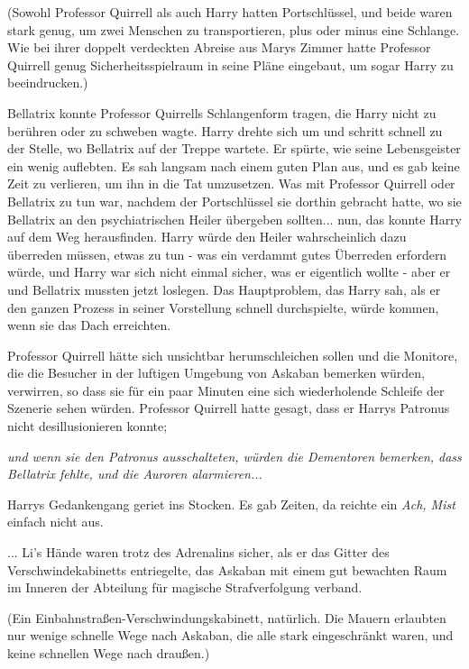 (Sowohl Professor Quirrell als auch Harry hatten Portschlüssel, und beide waren
stark genug, um zwei Menschen zu transportieren, plus oder minus eine Schlange.
Wie bei ihrer doppelt verdeckten Abreise aus Marys Zimmer hatte Professor
Quirrell genug Sicherheitsspielraum in seine Pläne eingebaut, um sogar Harry zu
beeindrucken.)

Bellatrix konnte Professor Quirrells Schlangenform tragen, die Harry nicht zu
berühren oder zu schweben wagte. Harry drehte sich um und schritt schnell zu der
Stelle, wo Bellatrix auf der Treppe wartete. Er spürte, wie seine Lebensgeister
ein wenig auflebten. Es sah langsam nach einem guten Plan aus, und es gab keine
Zeit zu verlieren, um ihn in die Tat umzusetzen. Was mit Professor Quirrell oder
Bellatrix zu tun war, nachdem der Portschlüssel sie dorthin gebracht hatte, wo
sie Bellatrix an den psychiatrischen Heiler übergeben sollten... nun, das konnte
Harry auf dem Weg herausfinden. Harry würde den Heiler wahrscheinlich dazu
überreden müssen, etwas zu tun - was ein verdammt gutes Überreden erfordern
würde, und Harry war sich nicht einmal sicher, was er eigentlich wollte - aber
er und Bellatrix mussten jetzt loslegen. Das Hauptproblem, das Harry sah, als er
den ganzen Prozess in seiner Vorstellung schnell durchspielte, würde kommen,
wenn sie das Dach erreichten.

Professor Quirrell hätte sich unsichtbar herumschleichen sollen und die
Monitore, die die Besucher in der luftigen Umgebung von Askaban bemerken würden,
verwirren, so dass sie für ein paar Minuten eine sich wiederholende Schleife der
Szenerie sehen würden. Professor Quirrell hatte gesagt, dass er Harrys Patronus
nicht desillusionieren konnte;

\emph{und wenn sie den Patronus ausschalteten, würden die Dementoren bemerken,
dass Bellatrix fehlte, und die Auroren alarmieren...}

Harrys Gedankengang geriet ins Stocken.
Es gab Zeiten, da reichte ein \emph{ \glqq{}Ach, Mist\grqq{}} einfach nicht
aus.

... Li's Hände waren trotz des Adrenalins sicher, als er das Gitter des
Verschwindekabinetts entriegelte, das Askaban mit einem gut bewachten Raum im
Inneren der Abteilung für magische Strafverfolgung verband.

(Ein Einbahnstraßen-Verschwindungskabinett, natürlich. Die Mauern erlaubten nur
wenige schnelle Wege nach Askaban, die alle stark eingeschränkt waren, und keine
schnellen Wege nach draußen.)

